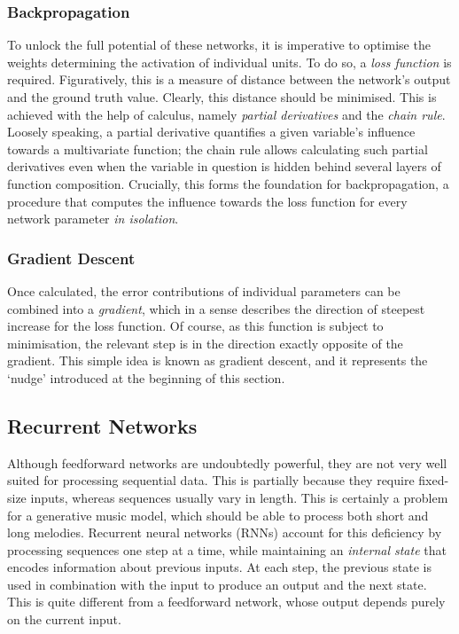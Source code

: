 \documentclass[../../report.tex]{subfiles}
\begin{document}
\subsubsection{Backpropagation}
To unlock the full potential of these networks, it is imperative to optimise the
weights determining the activation of individual units. To do so, a \emph{loss
function} is required. Figuratively, this is a measure of distance between the
network's output and the ground truth value. Clearly, this distance should be
minimised. This is achieved with the help of calculus, namely \emph{partial
derivatives} and the \emph{chain rule}. Loosely speaking, a partial derivative
quantifies a given variable's influence towards a multivariate function; the
chain rule allows calculating such partial derivatives even when the variable in
question is hidden behind several layers of function composition. Crucially,
this forms the foundation for backpropagation, a procedure that computes the
influence towards the loss function for every network parameter \emph{in
isolation}.

\subsubsection{Gradient Descent}
Once calculated, the error contributions of individual parameters can be
combined into a \emph{gradient}, which in a sense describes the direction of
steepest increase\footnotemark{} for the loss function. Of course, as this
function is subject to minimisation, the relevant step is in the direction
exactly opposite of the gradient. This simple idea is known as gradient descent,
and it represents the `nudge' introduced at the beginning of this section.



\subsection{Recurrent Networks}

Although feedforward networks are undoubtedly powerful, they are not very well
suited for processing sequential data. This is partially because they require
fixed-size inputs, whereas sequences usually vary in length. This is certainly a
problem for a generative music model, which should be able to process both short
and long melodies. Recurrent neural networks (RNNs) account for this deficiency
by processing sequences one step at a time, while maintaining an \emph{internal
state} that encodes information about previous inputs. At each step, the
previous state is used in combination with the input to produce an output and
the next state. This is quite different from a feedforward network, whose output
depends purely on the current input.
\end{document}
